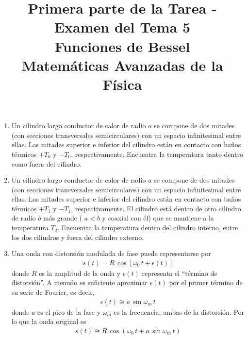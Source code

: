 
\author{}
\title{Primera parte de la Tarea - Examen del Tema 5  \\ \large{Funciones de Bessel \\ Matemáticas Avanzadas de la Física}} \vspace{-1.5\baselineskip}
\date{ }

\vspace{-4cm}
\renewcommand\labelenumii{\theenumi.{\arabic{enumii})}}
\maketitle
\fontsize{14}{14}\selectfont
\begin{enumerate}
\item Un cilindro largo conductor de calor de radio $a$ se compone de dos mitades (con secciones transversales semicirculares) con un espacio infinitesimal entre ellas. Las mitades superior e inferior del cilindro están en contacto con baños térmicos $+T_{0}$ y $-T_{0}$, respectivamente. Encuentra la temperatura tanto dentro como fuera del cilindro.
\item Un cilindro largo conductor de calor de radio $a$ se compone de dos mitades (con secciones transversales semicirculares) con un espacio infinitesimal entre ellas. Las mitades superior e inferior del cilindro están en contacto con baños térmicos $+T_{1}$ y $-T_{1}$, respectivamente. El cilindro está dentro de otro cilindro de radio $b$ más grande ( $a < b$ y coaxial con él) que se mantiene a la temperatura $T_{2}$. Encuentra la temperatura dentro del cilindro interno, entre los dos cilindros y fuera del cilindro externo.
\item Una onda con distorsión modulada de fase puede representarse por
\begin{align*}
s(t) = R \, \cos [ \omega_{0} \, t +  \epsilon (t)]
\end{align*}
donde $R$ es la amplitud de la onda y $\epsilon(t)$ representa el \enquote{término de distorsión}. A menudo es suficiente aproximar $\epsilon (t)$ por el primer término de su serie de Fourier, es decir,
\begin{align*}
\epsilon (t) \cong a \, \sin \omega_{m} \, t
\end{align*}
donde $a$ es el pico de la fase y $\omega_{m}$ es la frecuencia, ambas de la distorsión. Por lo que la onda original es
\begin{align*}
s(t) \cong R \, \cos (\omega_{0} \, t + a \, \sin \omega_{m} \, t)

\end{align*}
\end{enumerate}
